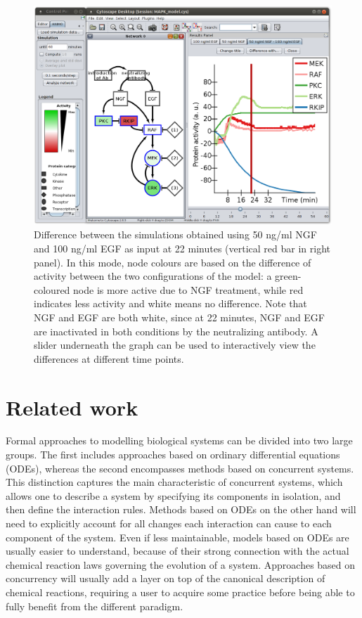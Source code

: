 \documentclass[journal, 10pt]{IEEEtran}
\begin{document}
\begin{figure}[htb]
\centering
  \includegraphics[width=.48\textwidth]{mapk_model_diff4}
\caption{Difference between the simulations obtained using
50 ng/ml NGF and 100 ng/ml EGF as input at 22 minutes (vertical red bar in right panel). In this mode, node colours
are based on the difference of activity between the two configurations of the model:
a green-coloured node is more active due to NGF treatment, while red indicates less activity and white
means no difference. Note that NGF and EGF are both white, since at 22 minutes, 
NGF and EGF are inactivated in both conditions by the neutralizing antibody. A slider underneath the graph can be used to 
interactively view the differences at different time points. \label{fig:case-study-diff}}
\end{figure}




\section{Related work}\label{sec:related-work}
Formal approaches to modelling biological systems can be divided into two large groups. The first 
includes approaches based on ordinary differential equations (ODEs), whereas the second 
encompasses methods based on concurrent systems. This distinction captures the main
characteristic of concurrent systems, which allows one to describe a system by specifying its
components in isolation, and then define the interaction rules. Methods based on ODEs on the other 
hand will need to explicitly account for all changes each interaction can cause to each component of the system.
Even if less maintainable, models based on ODEs are usually easier to understand, because of their strong
connection with the actual chemical reaction laws governing the evolution of a system. Approaches based 
on concurrency will usually add a layer on top of the canonical description of chemical reactions, 
requiring a user to acquire some practice before being able to fully benefit from the different paradigm.
\end{document}
